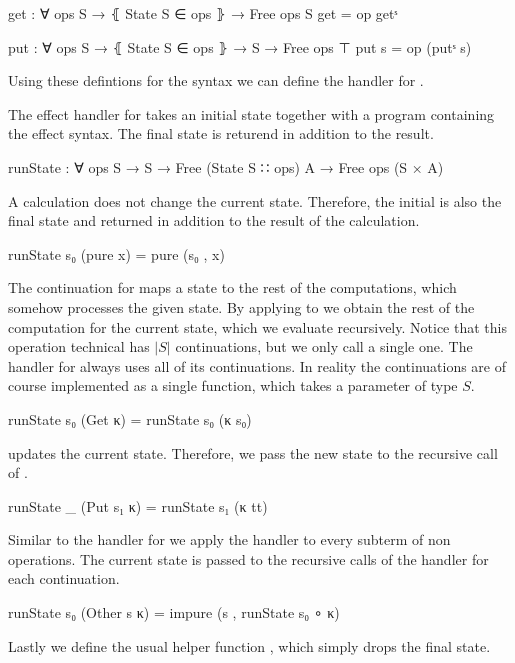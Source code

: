 \begin{code}
get : ∀ {ops S} → ⦃ State S ∈ ops ⦄ → Free ops S
get = op getˢ

put : ∀ {ops S} → ⦃ State S ∈ ops ⦄ → S → Free ops ⊤
put s = op (putˢ s)
\end{code}
Using these defintions for the syntax we can define the handler for
.

\begin{AgdaAlign}
The effect handler for  takes an initial state together
with a program containing the effect syntax.
The final state is returend in addition to the result.

\begin{code}
runState : ∀ {ops S} → S → Free (State S ∷ ops) A → Free ops (S × A)
\end{code}
A  calculation does not change the current state.
Therefore, the initial is also the final state and returned in addition to the
result of the calculation.
\begin{code}
runState s₀ (pure x)     = pure (s₀ , x)
\end{code}
The continuation for  maps a state to the rest of the
computations, which somehow processes the given state.
By applying  to  we obtain the rest of the
computation for the current state, which we evaluate recursively.
Notice that this operation technical has $|S|$ continuations, but we only call a
single one.
The handler for  always uses all of its continuations.
In reality the continuations are of course implemented as a single function,
which takes a parameter of type $S$.
\begin{code}
runState s₀ (Get κ)      = runState s₀ (κ s₀)
\end{code}
 updates the current state.
Therefore, we pass the new state  to the recursive call of
.
\begin{code}
runState _  (Put s₁ κ)   = runState s₁ (κ tt)
\end{code}
Similar to the handler for  we apply the handler to every
subterm of non  operations.
The current state is passed to the recursive calls of the handler for each
continuation.
\begin{code}
runState s₀ (Other s κ)  = impure (s , runState s₀ ∘ κ)
\end{code}
\end{AgdaAlign}
Lastly we define the usual helper function , which
simply drops the final state.


